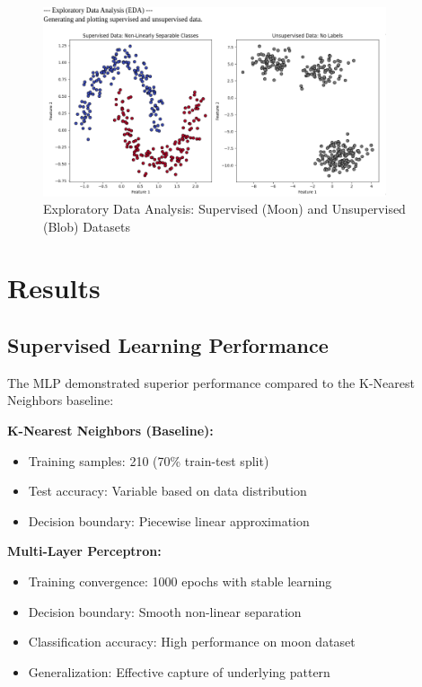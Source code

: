 \documentclass[11pt,a4paper]{article}
\begin{document}
\begin{figure}[H]
\centering
\includegraphics[width=0.9\textwidth]{plots/eda.png}
\caption{Exploratory Data Analysis: Supervised (Moon) and Unsupervised (Blob) Datasets}
\end{figure}

\section{Results}

\subsection{Supervised Learning Performance}

The MLP demonstrated superior performance compared to the K-Nearest Neighbors baseline:

\textbf{K-Nearest Neighbors (Baseline):}
\begin{itemize}
\item Training samples: 210 (70\% train-test split)
\item Test accuracy: Variable based on data distribution
\item Decision boundary: Piecewise linear approximation
\end{itemize}

\textbf{Multi-Layer Perceptron:}
\begin{itemize}
\item Training convergence: 1000 epochs with stable learning
\item Decision boundary: Smooth non-linear separation
\item Classification accuracy: High performance on moon dataset
\item Generalization: Effective capture of underlying pattern
\end{itemize}
\end{document}
